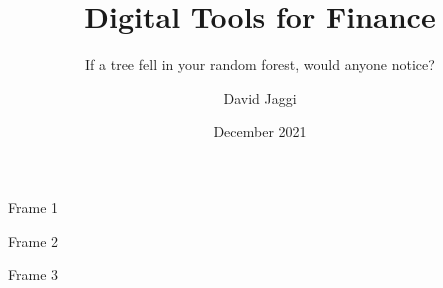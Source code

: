 \documentclass[10pt,aspectratio=169]{beamer}
\title{Digital Tools for Finance}
\subtitle{If a tree fell in your random forest, would anyone notice?}
\author{David Jaggi}
\institute{University of Zurich}
\date{December 2021}
\begin{document}
\frame{\titlepage}
\begin{frame}{Frame 1}
    
\end{frame}
\begin{frame}{Frame 2}
    
\end{frame}
\begin{frame}{Frame 3}
    
\end{frame}
\end{document}
